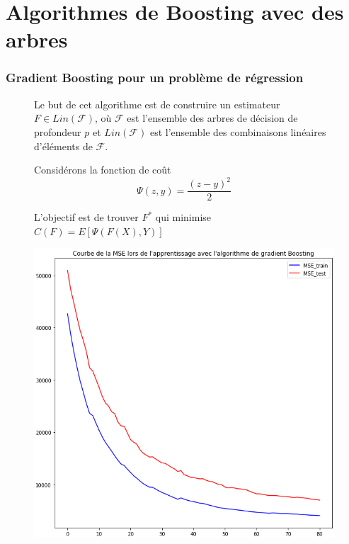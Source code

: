 \documentclass{beamer}
\theoremstyle{definition}
\begin{document}
\section{Algorithmes de Boosting avec des arbres}
\begin{frame}
	\frametitle{Gradient Boosting pour un problème de régression}
	
		\begin{minipage}[t]{1\linewidth}
		\begin{minipage}[t]{0.5\linewidth}\centering\begin{figure}
			\raggedright	
			Le but de cet algorithme est de construire un estimateur $F\in Lin\mathcal{(F)}$, où $\mathcal{F}$ est l'ensemble des arbres de décision de profondeur $p$ et $Lin\mathcal{(F)}$ est l'ensemble des combinaisons linéaires d'éléments de $\mathcal{F}$.
			
			Considérons la fonction de coût $$\Psi(z, y)= \dfrac{(z-y)^2}{2} $$
			
			L'objectif est de trouver $F^*$ qui minimise $C(F) = E[\Psi(F(X),Y)] $
			
			
		
			
				
		\end{figure}\end{minipage}\hfill 
		\begin{minipage}[t]{0.48\linewidth}\centering\begin{figure}
				\begin{center}
					\centering
					\includegraphics[width=1\linewidth]{reg_boost.png}
					
				\end{center}
				
		\end{figure}\end{minipage}
	\end{minipage}
	
\end{frame}
\end{document}
